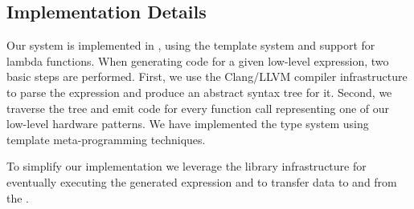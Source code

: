 \subsection{Implementation Details}
Our system is implemented in \Cpp, using the template system and support for lambda functions. 
When generating code for a given low-level expression, two basic steps are performed.
First, we use the Clang/LLVM compiler infrastructure to parse the expression and produce an abstract syntax tree for it.
Second, we traverse the tree and emit code for every function call representing one of our low-level hardware patterns.
We have implemented the type system using template meta-programming techniques.

To simplify our implementation we leverage the \SkelCL library infrastructure for eventually executing the generated \OpenCL expression and to transfer data to and from the \GPU.



